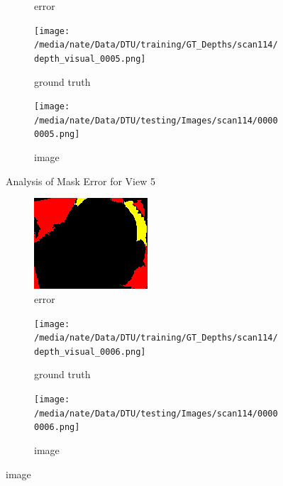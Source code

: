 \documentclass{article}
\begin{document}
\begin{figure}
\begin{subfigure}{0.3\textwidth}
		\caption{error}
		\label{fig:error5}
	\end{subfigure}
	\hfill
	\centering
	\begin{subfigure}{0.3\textwidth}
		\centering
		\texttt{[image: /media/nate/Data/DTU/training/GT\_Depths/scan114/depth\_visual\_0005.png]}
		\caption{ground truth}
		\label{fig:gt5}
	\end{subfigure}
	\hfill
	\centering
	\begin{subfigure}{0.3\textwidth}
		\centering
		\texttt{[image: /media/nate/Data/DTU/testing/Images/scan114/00000005.png]}
		\caption{image}
		\label{fig:img5}
	\end{subfigure}
	\hfill
	\caption{Analysis of Mask Error for View 5}
	\label{fig:error_analys5}
\end{figure}\begin{figure}
	\centering
	\begin{subfigure}{0.3\textwidth}
		\centering
		\includegraphics[width=\textwidth]{./output/006_error.png}
		\caption{error}
		\label{fig:error6}
	\end{subfigure}
	\hfill
	\centering
	\begin{subfigure}{0.3\textwidth}
		\centering
		\texttt{[image: /media/nate/Data/DTU/training/GT\_Depths/scan114/depth\_visual\_0006.png]}
		\caption{ground truth}
		\label{fig:gt6}
	\end{subfigure}
	\hfill
	\centering
	\begin{subfigure}{0.3\textwidth}
		\centering
		\texttt{[image: /media/nate/Data/DTU/testing/Images/scan114/00000006.png]}
		\caption{image}

\end{subfigure}
\end{figure}
\end{document}
